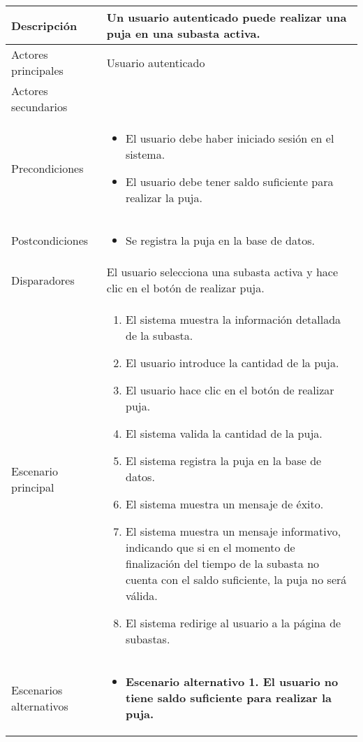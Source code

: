 \begin{longtable}{
    >{\columncolor{lightgreen!20}}p{4cm}
    p{12cm}
    }
    \midrule
    Descripción & Un usuario autenticado puede realizar una puja en una subasta activa. \\
    \midrule
    Actores principales & Usuario autenticado \\
    \midrule
    Actores secundarios &  \\
    \midrule
    Precondiciones & \begin{itemize}[nosep,leftmargin=*]
        \item El usuario debe haber iniciado sesión en el sistema.
        \item El usuario debe tener saldo suficiente para realizar la puja.
    \end{itemize} \\
    \midrule
    Postcondiciones & \begin{itemize}[nosep,leftmargin=*]
        \item Se registra la puja en la base de datos.
    \end{itemize} \\
    \midrule
    Disparadores & El usuario selecciona una subasta activa y hace clic en el botón de realizar puja. \\
    \midrule
    Escenario principal & \begin{enumerate}[nosep,leftmargin=*]
        \item El sistema muestra la información detallada de la subasta.
        \item El usuario introduce la cantidad de la puja.
        \item El usuario hace clic en el botón de realizar puja.
        \item El sistema valida la cantidad de la puja.
        \item El sistema registra la puja en la base de datos.
        \item El sistema muestra un mensaje de éxito.
        \item El sistema muestra un mensaje informativo, indicando que si en el momento de finalización del tiempo de la subasta no cuenta con el saldo suficiente, la puja no será válida.
        \item El sistema redirige al usuario a la página de subastas.
    \end{enumerate} \\
    \midrule
    Escenarios alternativos & 
    \begin{itemize}[nosep,leftmargin=*]
        \item \textbf{Escenario alternativo 1. El usuario no tiene saldo suficiente para realizar la puja.}

\end{itemize}
\end{longtable}
